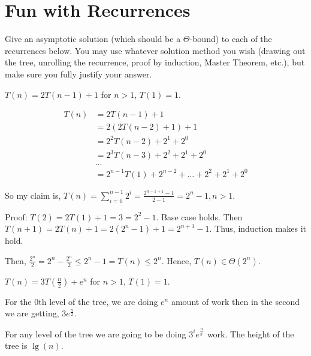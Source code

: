 \section{Fun with Recurrences}

Give an asymptotic solution (which should be a $\Theta$-bound) to each of the recurrences below. You may use whatever solution method you wish (drawing out the tree, unrolling the recurrence, proof by induction, Master Theorem, etc.), but make sure you fully justify your answer.

\begin{questions}
	\question[3] $T(n) = 2T(n-1) + 1$ for $n > 1$, $T(1) = 1$.

	\ifsolutions\fi
	\begin{soln}
		\begin{align*}
			T(n) & = 2T(n-1) + 1                                    \\
			     & = 2(2T(n-2) + 1) + 1                             \\
			     & = 2^2T(n-2) + 2^1 + 2^0                          \\
			     & = 2^3T(n-3) + 2^2 + 2^1 + 2^0                    \\
			     & \dots                                            \\
			     & =2^{n-1}T(1) + 2^{n-2} + \dots + 2^2 + 2^1 + 2^0
		\end{align*}

		So my claim is, \(T(n) = \sum_{i = 0}^{n-1} 2^i = \frac{2^{n-1 + 1} - 1}{2 -1 } = 2^n - 1, n >1\).

		Proof: \(T(2) = 2T(1) + 1 = 3 = 2^2 - 1\). Base case holds. Then \(T(n+1) = 2T(n) + 1 = 2(2^n - 1) + 1 = 2^{n+1} - 1\). Thus, induction makes it hold.

		Then, \(\frac{2^{n}}{2} = 2^n - \frac{2^n}{2} \leq 2^n - 1 = T(n) \leq 2^n\). Hence, \(T(n) \in \Theta(2^n)\).
	\end{soln}

	\question[3] $T(n) = 3T\left( \frac{n}{2} \right) + e^n$ for $n > 1$, $T(1) = 1$.

	\ifsolutions\fi
	\begin{soln}
		For the \(0\)th level of the tree, we are doing \(e^n\) amount of work then in the second we are getting, \(3e^{\frac{n}{2}}\).

		For any level of the tree we are going to be doing \(3^i e^\frac{n}{2^i}\) work. The height of the tree is \(\lg(n)\).


\end{soln}
\end{questions}
